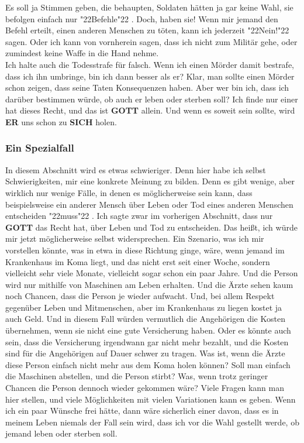 \documentclass[10pt,a5paper]{article}
\newcommand{\Er}[0]{\textbf{ER}}
\newcommand{\Gott}[0]{\textbf{GOTT}}
\newcommand{\Sich}[0]{\textbf{SICH}}
\newcommand{\q}[1]{\char"22{#1}\char"22 }
\begin{document}
		Es soll ja Stimmen geben,
		die behaupten,
		Soldaten h\"atten ja gar keine Wahl,
		sie befolgen einfach nur \q{Befehle}.
		Doch, haben sie!
		Wenn mir jemand den Befehl erteilt,
		einen anderen Menschen zu t\"oten,
		kann ich jederzeit \q{Nein!} sagen.
		Oder ich kann von vornherein sagen,
		dass ich nicht zum Milit\"ar gehe,
		oder zumindest keine Waffe in die Hand nehme.
		\\
		Ich halte auch die Todesstrafe f\"ur falsch.
		Wenn ich einen M\"order damit bestrafe,
		dass ich ihn umbringe,
		bin ich dann besser als er?
		Klar,
		man sollte einen M\"order schon zeigen,
		dass seine Taten Konsequenzen haben.
		Aber wer bin ich,
		dass ich dar\"uber bestimmen w\"urde,
		ob auch er leben oder sterben soll?
		Ich finde nur einer hat dieses Recht,
		und das ist {\Gott} allein.
		Und wenn es soweit sein sollte,
		wird {\Er} uns schon zu {\Sich} holen.
		
	\subsubsection{Ein Spezialfall}
		In diesem Abschnitt wird es etwas schwieriger.
		Denn hier habe ich selbst Schwierigkeiten,
		mir eine konkrete Meinung zu bilden.
		Denn es gibt wenige,
		aber wirklich nur wenige F\"alle,
		in denen es m\"oglicherweise sein kann,
		dass beispielsweise ein anderer Mensch \"uber Leben oder Tod eines anderen Menschen entscheiden \q{muss}.
		Ich sagte zwar im vorherigen Abschnitt,
		dass nur {\Gott} das Recht hat,
		\"uber Leben und Tod zu entscheiden.
		Das hei{\ss}t,
		ich w\"urde mir jetzt m\"oglicherweise selbst widersprechen.
		Ein Szenario,
		was ich mir vorstellen k\"onnte,
		was in etwa in diese Richtung ginge,
		w\"are,
		wenn jemand im Krankenhaus im Koma liegt,
		und das nicht erst seit einer Woche,
		sondern vielleicht sehr viele Monate,
		vielleicht sogar schon ein paar Jahre.
		Und die Person wird nur mithilfe von Maschinen am Leben erhalten.
		Und die \"Arzte sehen kaum noch Chancen,
		dass die Person je wieder aufwacht.
		Und,
		bei allem Respekt gegen\"uber Leben und Mitmenschen,
		aber im Krankenhaus zu liegen kostet ja auch Geld.
		Und in diesem Fall w\"urden vermutlich die Angeh\"origen die Kosten \"ubernehmen,
		wenn sie nicht eine gute Versicherung haben.
		Oder es k\"onnte auch sein,
		dass die Versicherung irgendwann gar nicht mehr bezahlt,
		und die Kosten sind f\"ur die Angeh\"origen auf Dauer schwer zu tragen.
		Was ist,
		wenn die \"Arzte diese Person einfach nicht mehr aus dem Koma holen k\"onnen?
		Soll man einfach die Maschinen abstellen,
		und die Person stirbt?
		Was,
		wenn trotz geringer Chancen die Person dennoch wieder gekommen w\"are?
		Viele Fragen kann man hier stellen,
		und viele M\"oglichkeiten mit vielen Variationen kann es geben.
		Wenn ich ein paar W\"unsche frei h\"atte,
		dann w\"are sicherlich einer davon,
		dass es in meinem Leben niemals der Fall sein wird,
		dass ich vor die Wahl gestellt werde,
		ob jemand leben oder sterben soll.
		
\end{document}
